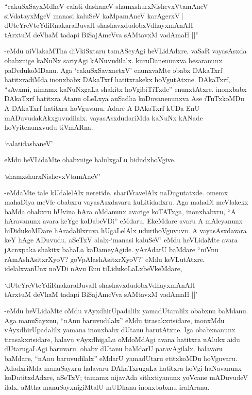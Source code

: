\begin{shloka}
``cakuSxSayxMdheV calati dashaneV shamxshurxNishevxVtamAneV\\
siVdatayxMgeV manasi kaluSeV kaMpamAneV karAgerxV |\\
dUteYreVteYdiRnakaraBuvaH shashavxdudobxVdhayxmAnAH\\
tArxtuM deVhaM tadapi BiSajAmeVva sAMtavxM vadAmaH ||''
\end{shloka}

-eMdu niVlakaMTha diVkiSxtaru tamASeyAgi heVLidAdxre. {}vaSaR vayasAsxda obabxnige kaNuNx sariyAgi kANuvudilalx. kuruDanenunxva hesaranunx paDedukoMDanu. Aga `cakuSxSavxnetxV' enunxvaMte obabx DAkaTxrf hatitxradiMda inonxbabx DAkaTxrf hatitxrakekx hoVgutAtxne. DAkaTxrf, ``sAvxmi, nimamx kaNuNxgaLa shakitx hoVgibiTiTxde'' enunxtAtxre. inonxbabx DAkaTxrf hatitxra Atanu oLeLxya auSadha koDuvanenunxva Ase iTuTxkoMDu A DAkaTxrf hatitxra hoVguvanu. Adare A DAkaTxrf kUDa EnU mADuvudakAkxguvudilalx. vayasAsxdudariMda kaNuNx kANade hoVyitenunxvudu tiVmARna.

`calatidashaneV'

eMdu heVLidaMte obabxnige halulxgaLu bidudxhoVgive.

\begin{shloka}
`shamxshurxNishevxVtamAneV'
\end{shloka}

-eMdaMte tale kUdalelAlx neretide. shariVravelAlx naDugutatxde. omemx mahaDiya meVle obabxru vayasAsxdavaru kuLitidadxru. Aga mahaDi meVlakekx baMda obabxru hUvina hAra oMdanunx avarige koTATxga, inonxbabxru, ``A hAravanunx avara keYge koDabeVDi'' eMdaru. EkeMdare avaru A mAleyanunx hiDidukoMDare hAradalilxruva hUgaLelAlx udurihoVguvuvu. A vayasAsxdavara keY hAge ADuvudu. aSeTxV alalx-`manasi kaluSeV' eMdu heVLidaMte avara jAcnxpaka shakitx bahaLa kaDameyAgide. yArAdarU baMdare ``niVnu rAmAshAsitxrXyoV? goVpAlashAsitxrXyoV?' eMdu keVLutAtxre. idelalxvanUnx noVDi nAvu Enu tiLidukoLaLxbeVkeMdare,

\begin{shloka}
`dUteYreVteYdiRnakaraBuvaH shashavxdudobxVdhayxmAnAH\\
tArxtuM deVhaM tadapi BiSajAmeVva sAMtavxM vadAmaH ||'
\end{shloka}

-eMdu heVLidaMte oMdu vAyxdhirUpadalilx yamadUtaralilx obabxnu baMdanu. Aga manuSayxnu, ``nAnu baruvudilalx'' eMdu tirasakxrisidare, inonxMdu vAyxdhirUpadalilx yamana inonxbabx dUtanu barutAtxne. Iga obabxnanunx tirasakxrisidare, halavu vAyxdhigaLu oMdoMdAgi avana hatitxra nAlukx aidu dUtarugaLAgi baruvaru. obabx dUtanu baMdarU paravAgilalx. halavaru baMdare, ``nAnu baruvudilalx'' eMdarU yamadUtaru etitxkoMDu hoVguvaru. AdadxriMda manuSayxru halavaru DAkaTxrugaLa hatitxra hoVgi haNavanunx koDutitxdAdxre, aSeTxV; tamamx nijavAda sithxtiyanunx yoVcane mADuvudeV ilalx. aMtha manuSayxnigiMtalU mUDhanu inonxbabxnu iralAranu.

